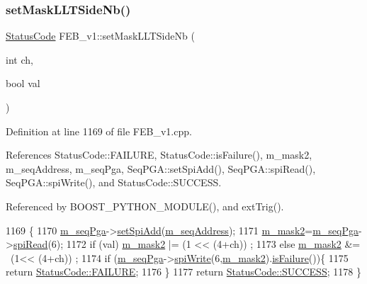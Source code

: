 \subsubsection{\texorpdfstring{set\+Mask\+L\+L\+T\+Side\+Nb()}{setMaskLLTSideNb()}}
{\footnotesize\ttfamily \hyperlink{classStatusCode}{Status\+Code} F\+E\+B\+\_\+v1\+::set\+Mask\+L\+L\+T\+Side\+Nb (\begin{DoxyParamCaption}\item[{int}]{ch,  }\item[{bool}]{val }\end{DoxyParamCaption})}



Definition at line 1169 of file F\+E\+B\+\_\+v1.\+cpp.



References Status\+Code\+::\+F\+A\+I\+L\+U\+RE, Status\+Code\+::is\+Failure(), m\+\_\+mask2, m\+\_\+seq\+Address, m\+\_\+seq\+Pga, Seq\+P\+G\+A\+::set\+Spi\+Add(), Seq\+P\+G\+A\+::spi\+Read(), Seq\+P\+G\+A\+::spi\+Write(), and Status\+Code\+::\+S\+U\+C\+C\+E\+SS.



Referenced by B\+O\+O\+S\+T\+\_\+\+P\+Y\+T\+H\+O\+N\+\_\+\+M\+O\+D\+U\+L\+E(), and ext\+Trig().


\begin{DoxyCode}
1169                                                    \{
1170   \hyperlink{classFEB__v1_a6c7804ac86796f233a8393043adf2e77}{m\_seqPga}->\hyperlink{classSeqPGA_ac998ce3a6d9b5f2e88cc8393f8c1df53}{setSpiAdd}(\hyperlink{classFEB__v1_a1c1eb093fd1733b9510fcf8bc5c7ad08}{m\_seqAddress});
1171   \hyperlink{classFEB__v1_a25f03f6de00618dd575fc1f77a9af9ee}{m\_mask2}=\hyperlink{classFEB__v1_a6c7804ac86796f233a8393043adf2e77}{m\_seqPga}->\hyperlink{classSeqPGA_ab3d0e5e5d4014bc7a92588a76b8713d4}{spiRead}(6);
1172   \textcolor{keywordflow}{if} (val)  \hyperlink{classFEB__v1_a25f03f6de00618dd575fc1f77a9af9ee}{m\_mask2} |= (1 << (4+ch))  ;
1173   \textcolor{keywordflow}{else}      \hyperlink{classFEB__v1_a25f03f6de00618dd575fc1f77a9af9ee}{m\_mask2} &= ~(1<< (4+ch)) ;
1174   \textcolor{keywordflow}{if} (\hyperlink{classFEB__v1_a6c7804ac86796f233a8393043adf2e77}{m\_seqPga}->\hyperlink{classSeqPGA_ad4421841ce4ce8b88ad13f63216f0743}{spiWrite}(6,\hyperlink{classFEB__v1_a25f03f6de00618dd575fc1f77a9af9ee}{m\_mask2}).\hyperlink{classStatusCode_a5dd22dc6eb2c52fc4cabc58f6dea2eb7}{isFailure}())\{
1175     \textcolor{keywordflow}{return} \hyperlink{classStatusCode_a6f565cbeadc76d14c72f047e5e85eb4ba3da73d4c469762eb9d3c960368252b26}{StatusCode::FAILURE};
1176   \}
1177   \textcolor{keywordflow}{return} \hyperlink{classStatusCode_a6f565cbeadc76d14c72f047e5e85eb4badd0da38d3ba0d922efd1f4619bc37ad8}{StatusCode::SUCCESS};
1178 \}
\end{DoxyCode}
\mbox{\label{classFEB__v1_a904bff89e5ad45ce78730502dc26a0e3}} 

